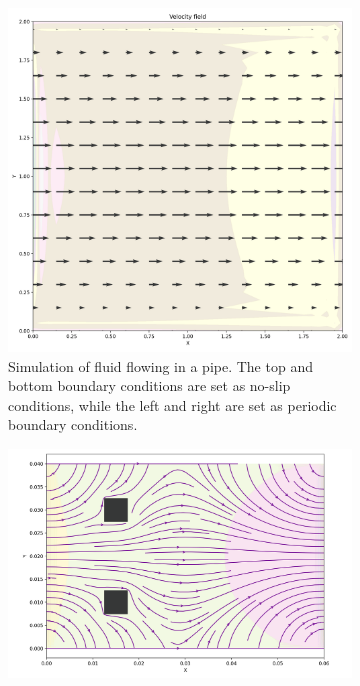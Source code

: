 \begin{figure}[!ht]
    \centering
    \begin{subfigure}{.28\textwidth}
        \centering
        \includegraphics[width=\linewidth]{Figures/pipe_flow_example_quiver.png}
        \caption{Simulation of fluid flowing in a pipe. The top and bottom boundary conditions are set as no-slip conditions, while the left and right are set as periodic boundary conditions.}
        \label{fig:sub11}
    \end{subfigure}%
    \hspace{0.04\textwidth}
    \begin{subfigure}{.28\textwidth}
        \centering
        \includegraphics[width=\linewidth]{Figures/two_box_example_streamline.png}

\end{subfigure}
\end{figure}
